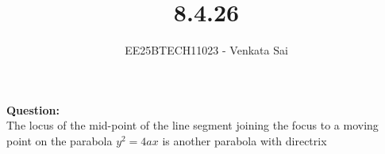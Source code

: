 \documentclass[journal]{IEEEtran}
\begin{document}


\title{8.4.26}
\author{EE25BTECH11023 - Venkata Sai}
\maketitle \vspace{-1em}
\renewcommand{\thefigure}{\theenumi}
\renewcommand{\thetable}{\theenumi}
\setlength{\intextsep}{10pt} %

\renewcommand{\thetable}{\theenumi}

\textbf{Question:}  \\
The locus of the mid-point of the line segment joining the focus to a moving point
on the parabola $y^2 = 4ax$ is another parabola with directrix
 
\end{document}
